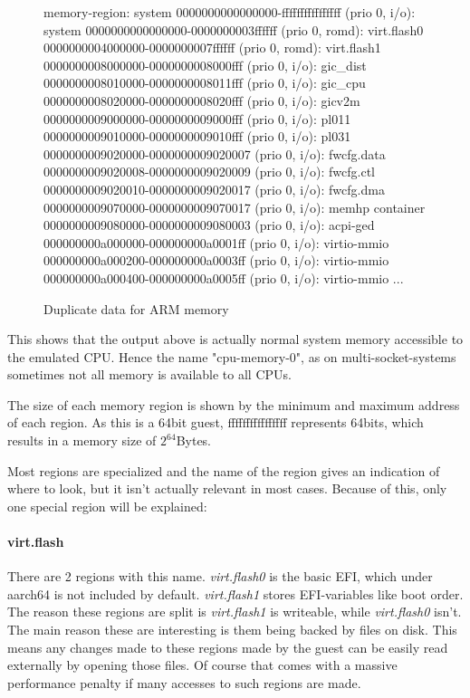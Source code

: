 \begin{figure}[H]
\begin{ffcode}
    memory-region: system
    0000000000000000-ffffffffffffffff (prio 0, i/o): system
      0000000000000000-0000000003ffffff (prio 0, romd): virt.flash0
      0000000004000000-0000000007ffffff (prio 0, romd): virt.flash1
      0000000008000000-0000000008000fff (prio 0, i/o): gic_dist
      0000000008010000-0000000008011fff (prio 0, i/o): gic_cpu
      0000000008020000-0000000008020fff (prio 0, i/o): gicv2m
      0000000009000000-0000000009000fff (prio 0, i/o): pl011
      0000000009010000-0000000009010fff (prio 0, i/o): pl031
      0000000009020000-0000000009020007 (prio 0, i/o): fwcfg.data
      0000000009020008-0000000009020009 (prio 0, i/o): fwcfg.ctl
      0000000009020010-0000000009020017 (prio 0, i/o): fwcfg.dma
      0000000009070000-0000000009070017 (prio 0, i/o): memhp container
      0000000009080000-0000000009080003 (prio 0, i/o): acpi-ged
      000000000a000000-000000000a0001ff (prio 0, i/o): virtio-mmio
      000000000a000200-000000000a0003ff (prio 0, i/o): virtio-mmio
      000000000a000400-000000000a0005ff (prio 0, i/o): virtio-mmio
      ...
\end{ffcode}
\caption{Duplicate data for ARM memory}
\label{fig:mem-duplicate}
\end{figure}

This shows that the output above is actually normal system memory accessible to the emulated CPU.
Hence the name "cpu-memory-0", as on multi-socket-systems sometimes not all memory is available to all CPUs.

The size of each memory region is shown by the minimum and maximum address of each region.
As this is a 64bit guest, ffffffffffffffff represents 64bits, which results in a memory size of $2^{64}$Bytes.

Most regions are specialized and the name of the region gives an indication of where to look,
but it isn't actually relevant in most cases.
Because of this, only one special region will be explained:

\paragraph{virt.flash}
There are 2 regions with this name. \emph{virt.flash0} is the basic EFI, which under aarch64 is not included by default.
\emph{virt.flash1} stores EFI-variables like boot order.
The reason these regions are split is \emph{virt.flash1} is writeable, while \emph{virt.flash0} isn't.
The main reason these are interesting is them being backed by files on disk.
This means any changes made to these regions made by the guest can be easily read externally by opening those files.
Of course that comes with a massive performance penalty if many accesses to such regions are made.

